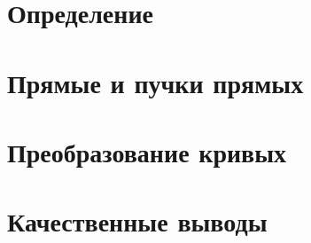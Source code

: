 \section{Определение}

\section{Прямые и пучки прямых}

\section{Преобразование кривых}

\section{Качественные выводы}
